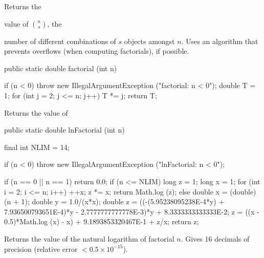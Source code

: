   \begin{tabb} Returns the \begin{latexonly}value of $\binom{n}{s}$, the
   \end{latexonly} number of different combinations
   of $s$ objects amongst $n$.  Uses an algorithm that prevents overflows
   (when computing factorials), if possible.
 \end{tabb}
 \begin{htmlonly}
 \end{htmlonly}
\begin{code}

   public static double factorial (int n)\begin{hide} {
      if (n < 0)
        throw new IllegalArgumentException ("factorial:   n < 0");
      double T = 1;
      for (int j = 2; j <= n; j++)
         T *= j;
      return T;
   }\end{hide}
\end{code}
 \begin{tabb} Returns the value of
 \end{tabb}
 \begin{htmlonly}
 \end{htmlonly}
\begin{code}

   public static double lnFactorial (int n)\begin{hide} {
      final int NLIM = 14;

      if (n < 0)
        throw new IllegalArgumentException ("lnFactorial:   n < 0");

      if (n == 0 || n == 1)
         return 0.0;
      if (n <= NLIM) {
         long z = 1;
         long x = 1;
         for (int i = 2; i <= n; i++) {
            ++x;
            z *= x;
         }
         return Math.log (z);
      }
      else {
         double x = (double)(n + 1);
         double y = 1.0/(x*x);
         double z = ((-(5.95238095238E-4*y) + 7.936500793651E-4)*y -
            2.7777777777778E-3)*y + 8.3333333333333E-2;
         z = ((x - 0.5)*Math.log (x) - x) + 9.1893853320467E-1 + z/x;
         return z;
      }
   }\end{hide}
\end{code}
 \begin{tabb} Returns the value of the natural logarithm of
  factorial $n$. Gives 16 decimals of precision
  (relative error $< 0.5\times 10^{-15}$).
 \end{tabb}
